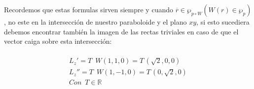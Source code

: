 \documentclass[11pt,letterpaper]{article}
\newcommand{\R}{\mathbb{R}}
\begin{document}
        Recordemos que estas formulas sirven siempre y cuando $\overline{r}\in \wp_{p\circ W}(W(r)\in \wp_{p})$, no este en la intersecci\'on de nuestro paraboloide y el plano $xy$, si esto sucediera debemos encontrar tambi\'en la imagen de las rectas triviales en caso de que el vector caiga sobre esta intersecci\'on:\,\\
        \,\\
        \begin{align*}
            L_z'=T\,\,\,W(1,1,0)=T\,(\sqrt{2},0,0)\\
            L_z''=T\,\,\,W(1,-1,0)=T\,(0,\sqrt{2},0)\\
            Con\,\,\,T\in \R
        \end{align*}
\end{document}
